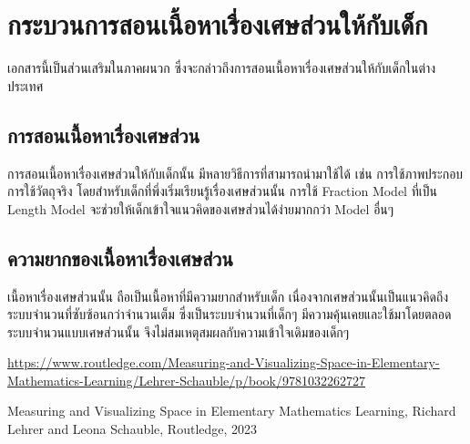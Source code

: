 \chapter{กระบวนการสอนเนื้อหาเรื่องเศษส่วนให้กับเด็ก}

\sloppy เอกสารนี้เป็นส่วนเสริมในภาคผนวก ซึ่งจะกล่าวถึงการสอนเนื้อหาเรื่องเศษส่วนให้กับเด็กในต่างประเทศ

\section{การสอนเนื้อหาเรื่องเศษส่วน}

การสอนเนื้อหาเรื่องเศษส่วนให้กับเด็กนั้น มีหลายวิธีการที่สามารถนำมาใช้ได้ เช่น การใช้ภาพประกอบ การใช้วัตถุจริง โดยสำหรับเด็กที่พึ่งเริ่มเรียนรู้เรื่องเศษส่วนนั้น การใช้ Fraction Model ที่เป็น Length Model จะช่วยให้เด็กเข้าใจแนวคิดของเศษส่วนได้ง่ายมากกว่า Model อื่นๆ

\section{ความยากของเนื้อหาเรื่องเศษส่วน}

เนื้อหาเรื่องเศษส่วนนั้น ถือเป็นเนื้อหาที่มีความยากสำหรับเด็ก เนื่องจากเศษส่วนนั้นเป็นแนวคิดถึงระบบจำนวนที่ซับซ้อนกว่าจำนวนเต็ม ซึ่งเป็นระบบจำนวนที่เด็กๆ มีความคุ้นเคยและใช้มาโดยตลอด
ระบบจำนวนแบบเศษส่วนนั้น จึงไม่สมเหตุสมผลกับความเข้าใจเดิมของเด็กๆ








\url{https://www.routledge.com/Measuring-and-Visualizing-Space-in-Elementary-Mathematics-Learning/Lehrer-Schauble/p/book/9781032262727}


Measuring and Visualizing Space in Elementary Mathematics Learning, Richard Lehrer and Leona Schauble, Routledge, 2023





